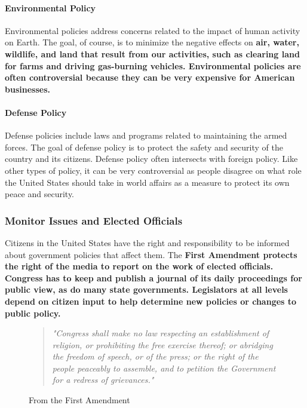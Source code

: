 \paragraph{Environmental Policy} Environmental policies address concerns related to the impact of human activity on Earth. The goal, of course, is to minimize the negative effects on \bf{air, water, wildlife,} and \bf{land} that result from our activities, such as clearing land for farms and driving gas-burning vehicles. Environmental policies are often controversial because they can be very expensive for American businesses.

\paragraph{Defense Policy} Defense policies include laws and programs related to maintaining the armed forces. The goal of defense policy is to protect the safety and security of the country and its citizens. Defense policy often intersects with foreign policy. Like other types of policy, it can be very controversial as people disagree on what role the United States should take in world affairs as a measure to protect its own peace and security.

\subsubsection*{Monitor Issues and Elected Officials}

Citizens in the United States have the right and responsibility to be informed about government policies that affect them. The \bf{First Amendment} protects the right of the media to report on the work of elected officials. Congress has to keep and publish a journal of its daily proceedings for public view, as do many state governments. Legislators at all levels depend on citizen input to help determine new policies or changes to public policy.

\begin{figure}[h]
    \begin{quote}
        \it{"Congress shall make no law respecting an establishment of religion, or prohibiting the free exercise thereof; or abridging the freedom of speech, or of the press; or the right of the people peaceably to assemble, and to petition the Government for a redress of grievances."}
    \end{quote}
    \caption{From the First Amendment}
\end{figure}


